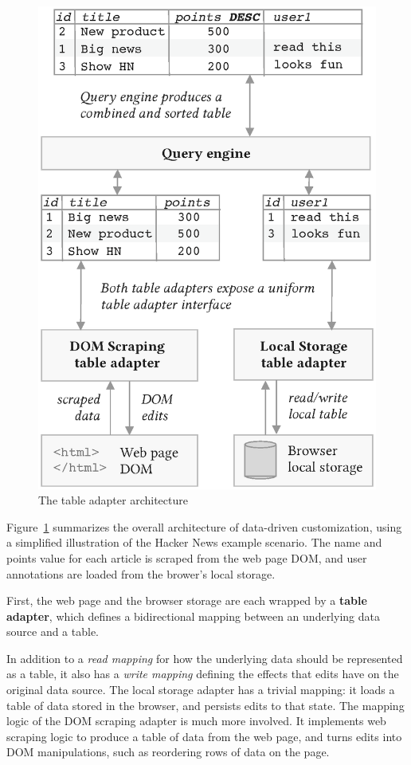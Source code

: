 \documentclass[sigplan,screen,10pt,anonymous,review]{acmart}
\begin{document}
\begin{figure}
\hypertarget{fig:table-adapter}{%
\centering
\includegraphics[width=\columnwidth]{media/table-adapter.eps}
\caption{The table adapter architecture}\label{fig:table-adapter}
}
\end{figure}

Figure~\ref{fig:table-adapter} summarizes the overall architecture of
data-driven customization, using a simplified illustration of the Hacker
News example scenario. The name and points value for each article is
scraped from the web page DOM, and user annotations are loaded from the
brower's local storage.

First, the web page and the browser storage are each wrapped by a
\textbf{table adapter}, which defines a bidirectional mapping between an
underlying data source and a table.

In addition to a \emph{read mapping} for how the underlying data should
be represented as a table, it also has a \emph{write mapping} defining
the effects that edits have on the original data source. The local
storage adapter has a trivial mapping: it loads a table of data stored
in the browser, and persists edits to that state. The mapping logic of
the DOM scraping adapter is much more involved. It implements web
scraping logic to produce a table of data from the web page, and turns
edits into DOM manipulations, such as reordering rows of data on the
page.
\end{document}
